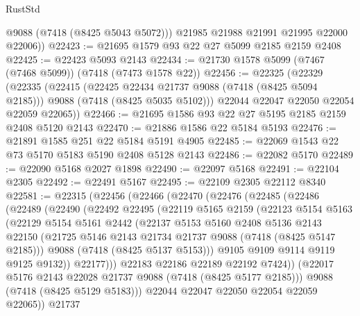 \begin{lexlean}{RustStd}
\begin{coremodule}
          @9088
          (@7418 (@8425 @5043 @5072)))
        @21985
        @21988
        @21991
        @21995
        @22000
        @22006))
@22423 := @21695 @1579 @93 @22 @27 @5099 @2185 @2159 @2408
@22425 := @22423 @5093 @2143
@22434 := @21730 @1578 @5099 (@7467 (@7468 @5099)) (@7418 (@7473 @1578 @22))
@22456 := @22325
    (@22329
      (@22335
        (@22415
          (@22425 @22434 @21737 @9088 (@7418 (@8425 @5094 @2185)))
          @9088
          (@7418 (@8425 @5035 @5102)))
        @22044
        @22047
        @22050
        @22054
        @22059
        @22065))
@22466 := @21695 @1586 @93 @22 @27 @5195 @2185 @2159 @2408 @5120 @2143
@22470 := @21886 @1586 @22 @5184 @5193
@22476 := @21891 @1585 @251 @22 @5184 @5191 @4905
@22485 := @22069 @1543 @22 @73 @5170 @5183 @5190 @2408 @5128 @2143
@22486 := @22082 @5170
@22489 := @22090 @5168 @2027 @1898
@22490 := @22097 @5168
@22491 := @22104 @2305
@22492 := @22491 @5167
@22495 := @22109 @2305 @22112 @8340
@22581 := @22315
    (@22456
      (@22466
        (@22470
          (@22476
            (@22485
              (@22486
                (@22489
                  (@22490
                    (@22492
                      @22495
                      (@22119
                        @5165
                        @2159
                        (@22123
                          @5154
                          @5163
                          (@22129
                            @5154
                            @5161
                            @2442
                            (@22137
                              @5153
                              @5160
                              @2408
                              @5136
                              @2143
                              @22150
                              (@21725 @5146 @2143 @21734 @21737 @9088 (@7418 (@8425 @5147 @2185)))
                              @9088
                              (@7418 (@8425 @5137 @5153)))
                            @9105
                            @9109
                            @9114
                            @9119
                            @9125
                            @9132))
                        @22177)))
                  @22183
                  @22186
                  @22189
                  @22192
                  @7424))
              (@22017 @5176 @2143 @22028 @21737 @9088 (@7418 (@8425 @5177 @2185)))
              @9088
              (@7418 (@8425 @5129 @5183)))
            @22044
            @22047
            @22050
            @22054
            @22059
            @22065))
        @21737

\end{coremodule}
\end{lexlean}
